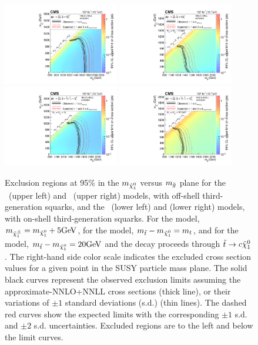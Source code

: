 \begin{figure}[!hbtp]
\centering
\includegraphics[width=0.45\textwidth]{figs/ssp/scan_t1tttt.pdf}
\includegraphics[width=0.45\textwidth]{figs/ssp/scan_t1ttbb.pdf}
\includegraphics[width=0.45\textwidth]{figs/ssp/scan_t5tttt.pdf}
\includegraphics[width=0.45\textwidth]{figs/ssp/scan_t5ttcc.pdf}
\caption{ Exclusion regions at 95\% \CL in the $m_{\tilde{\chi}_1^0}$ versus
  $m_{\tilde{g}}$ plane for the \Totttt~(upper left) and \TfttbbWW~(upper right) models, with off-shell third-generation squarks, and the
    \Tftttt~(lower left) and \Tfttcc (lower right) models, with on-shell third-generation squarks.
For the \TfttbbWW model, $m_{\tilde{\chi}_1^{\pm}} = m_{\tilde{\chi}_1^0} + 5\text{GeV}$, for the \Tftttt model, $m_{\tilde{t}} - m_{\tilde{\chi}_1^0} = m_{t}$, and
for the \Tfttcc model, $m_{\tilde{t}} - m_{\tilde{\chi}_1^0} = 20\text{GeV}$ and the decay proceeds through $\tilde{t} \to c \tilde{\chi}_1^0$.
The right-hand side color scale indicates the excluded cross section values for a given point in the SUSY particle mass plane.
The solid black curves represent the observed exclusion limits
assuming the approximate-NNLO+NNLL cross sections
(thick line), or their variations of $\pm 1$ standard deviations (s.d.) (thin lines).
The dashed red curves show the expected limits with the corresponding $\pm 1$ s.d. and $\pm 2$ s.d. uncertainties.
Excluded regions are to the left and below the limit curves.
}
\label{fig:t1ttxx_scan_xsec}
\end{figure}

